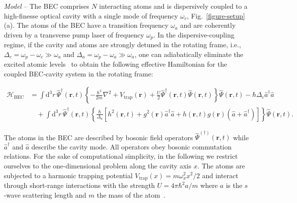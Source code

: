 \documentclass[aps,prl,twocolumn,superscriptaddress,groupedaddress]{revtex4}  %
\begin{document}


\textit{Model} -- 
The BEC comprises $N$ interacting atoms and is dispersively coupled to a high-finesse optical cavity with a single mode of frequency 
$\omega_c$, Fig.~\ref{figure-setup}(a). 
The atoms of the BEC have a transition frequency $\omega_a$ and are coherently driven by a transverse pump laser of frequency $\omega_p$. 
In the dispersive-coupling regime, if the cavity and atoms are strongly detuned in the rotating frame, i.e., $\Delta_c = \omega_p - \omega_c \gg \omega_a$ and 
$\Delta_a = \omega_p - \omega_a \gg \omega_a$, one can adiabatically eliminate the excited atomic levels~\cite{Nagy:2008} to obtain the following effective Hamiltonian 
for the coupled BEC-cavity system in the rotating frame:
\begin{widetext}
\begin{align}
\mathcal{H}_{\textrm{BEC}} 
&  = 
\int \mathrm{d}^3 r \, \hat{\Psi}^{\dagger}(\mathbf{r}, t) 
\left\{ 
-\frac{\hbar^2}{2m} \nabla^2 + V_{\textrm{trap}}(\mathbf{r}) + \frac{U}{2}  \hat{\Psi}^{\dagger}(\mathbf{r}, t)  \hat{\Psi}(\mathbf{r}, t) 
\right\} 
\hat{\Psi}(\mathbf{r}, t) - \hbar \Delta_c \hat{a}^{\dagger} \hat{a}   \nonumber \\
& \quad + \int \mathrm{d}^3 r \, \hat{\Psi}^{\dagger}(\mathbf{r}, t) \left\{ 
\frac{\hbar}{\Delta_a} \left[ h^2(\mathbf{r}, t) + g^2(\mathbf{r}) \hat{a}^{\dagger}\hat{a} + h(\mathbf{r}, t) g(\mathbf{r}) ( \hat{a} + \hat{a}^{\dagger}) \right] \right\} 
\hat{\Psi}(\mathbf{r}, t) .
\label{ham:BEC}
\end{align}
\end{widetext}
The atoms in the BEC are described by bosonic field operators $\hat{\Psi}^{(\dagger)}(\mathbf{r}, t)$ while $\hat{a}^\dagger$ and $\hat{a}$ describe the cavity mode. 
All operators obey bosonic commutation relations.
For the sake of computational simplicity, in the following we restrict ourselves to the one-dimensional problem along the cavity axis $x$. 
The atoms are subjected to a harmonic trapping potential $V_{\textrm{trap}} (x) = m \omega_x^2 x^2 / 2$ and interact through short-range interactions with the strength 
$U = 4 \pi \hbar^2 a / m$ where $a$ is the $s$-wave scattering length and $m$ the mass of the atom~\cite{HuangSM, Olshanii, PethickBEC}.
 
\end{document}
